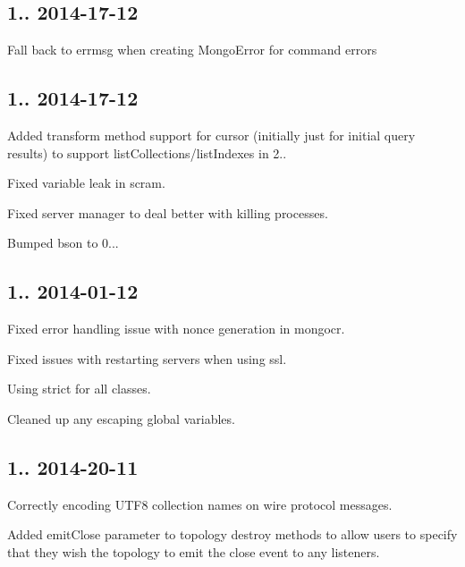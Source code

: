\subsection*{1.. 2014-\/17-\/12 }


\begin{DoxyItemize}
\item Fall back to errmsg when creating Mongo\+Error for command errors
\end{DoxyItemize}

\subsection*{1.. 2014-\/17-\/12 }


\begin{DoxyItemize}
\item Added transform method support for cursor (initially just for initial query results) to support list\+Collections/list\+Indexes in 2..
\item Fixed variable leak in scram.
\item Fixed server manager to deal better with killing processes.
\item Bumped bson to 0...
\end{DoxyItemize}

\subsection*{1.. 2014-\/01-\/12 }


\begin{DoxyItemize}
\item Fixed error handling issue with nonce generation in mongocr.
\item Fixed issues with restarting servers when using ssl.
\item Using strict for all classes.
\item Cleaned up any escaping global variables.
\end{DoxyItemize}

\subsection*{1.. 2014-\/20-\/11 }


\begin{DoxyItemize}
\item Correctly encoding U\+T\+F8 collection names on wire protocol messages.
\item Added emit\+Close parameter to topology destroy methods to allow users to specify that they wish the topology to emit the close event to any listeners.
\end{DoxyItemize}

